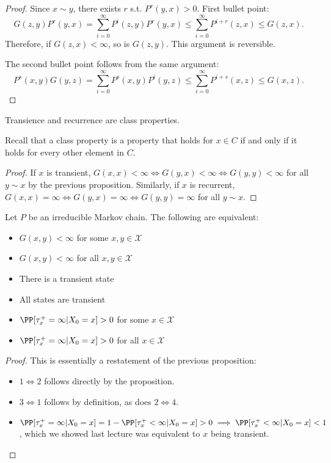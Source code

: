 \begin{proof}
Since $x\sim y$, there exists $r$ s.t. $P^r(y,x)>0$. First bullet point:
\[G(z,y)P^r(y,x) = \sum_{i=0}^{\infty}P^i(z,y)P^r(y,x)\leq \sum_{i=0}^{\infty}P^{i+r}(z,x)\leq G(z,x).\]
Therefore, if $G(z,x) < \infty$, so is $G(z,y)$. This argument is reversible. 

The second bullet point follows from the same argument: 
\[P^s(x,y)G(y,z) = \sum_{i=0}^{\infty}P^s(x,y)P^i(y,z)\leq \sum_{i=0}^{\infty}P^{i+s}(x,z)\leq G(x,z).\]
\end{proof}

\begin{theorem}
\corlabel

Transience and recurrence are class properties.  
\end{theorem}

Recall that a class property is a property that holds for $x\in C$ if and only if it holds for every other element in $C$. 

\begin{proof}
If $x$ is transient, $G(x,x)<\infty\iff G(y,x)<\infty\iff G(y,y)<\infty$ for all $y\sim x$ by the previous proposition. Similarly, if $x$ is recurrent, $G(x,x)=\infty\iff G(y,x)=\infty\iff G(y,y)=\infty$ for all $y\sim x$.
\end{proof}

\begin{theorem}
\corlabel

Let $P$ be an irreducible Markov chain. The following are equivalent:
\begin{itemize}
    \item $G(x,y) < \infty$ for some $x,y\in \mathcal{X}$
    \item $G(x,y) < \infty$ for all $x,y\in \mathcal{X}$
    \item There is a transient state
    \item All states are transient
    \item $\PP[\tau_x^+=\infty|X_0=x]>0$ for some $x\in \mathcal{X}$
    \item $\PP[\tau_x^+=\infty|X_0=x]>0$ for all $x\in \mathcal{X}$
\end{itemize}
\end{theorem}

\begin{proof} This is essentially a restatement of the previous proposition:
\begin{itemize}
    \item $1\iff 2$ follows directly by the proposition.
    \item $3\iff 1$ follows by definition, as does $2\iff 4$.
    \item $\PP[\tau_x^+=\infty|X_0=x] = 1-\PP[\tau_x^+<\infty|X_0=x] > 0\implies \PP[\tau_x^+<\infty|X_0=x] < 1$, which we showed last lecture was equivalent to $x$ being transient. 
\end{itemize}
\end{proof}

